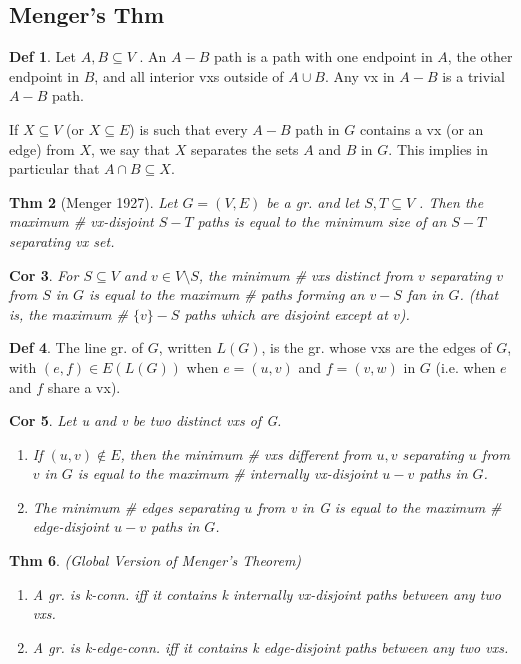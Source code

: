 \documentclass[11pt, fleqn, a4paper, landscape]{article}
\theoremstyle{plain} %
\newtheorem{thm}{Thm}
\newtheorem{cor}[thm]{Cor}
\theoremstyle{remark} %
\theoremstyle{definition} %
\newtheorem{defi}[thm]{Def}
\begin{document}
\begin{multicols}{5}
\subsection{Menger’s Thm}

\begin{defi}
Let $A,B \subseteq V$ . An $A-B$ path is a path with one endpoint in $A$, the other endpoint in $B$, and all interior vxs outside of $A \cup B$. Any vx in $A - B$ is a trivial $A-B$ path.

If $X \subseteq V$ (or $X \subseteq E$) is such that every $A-B$ path in $G$ contains a vx (or an edge) from $X$, we say that $X$ separates the sets $A$ and $B$ in $G$. This implies in particular that $A \cap B \subseteq X$.
\end{defi}
\begin{thm}[Menger 1927]
Let $G = (V,E)$ be a gr. and let $S, T \subseteq V$ . Then the maximum
\# vx-disjoint $S-T$ paths is equal to the minimum size of an $S-T$ separating vx set.
\end{thm}

\begin{cor}
For $S \subseteq V$ and $v\in V \setminus S$, the minimum \# vxs distinct from $v$ separating $v$ from $S$ in $G$ is equal to the maximum \# paths forming an $v-S$ fan in $G$. (that is, the maximum \# $\{v\}-S$ paths which are disjoint except at $v$).
\end{cor}

\begin{defi}
The line gr. of $G$, written $L(G)$, is the gr. whose vxs are the edges of $G$, with $(e, f) \in E(L(G))$ when $e = (u, v)$ and $f = (v,w)$ in $G$ (i.e. when $e$ and $f$ share a vx).
\end{defi}
\addtocounter{thm}{1}
\begin{cor}
Let u and v be two distinct vxs of G.
\begin{enumerate}
\item If $(u, v) \notin E$, then the minimum \# vxs different from $u, v$ separating $u$ from $v$ in $G$ is equal to the maximum \# internally vx-disjoint $u-v$ paths in $G$.
\item The minimum \# edges separating $u$ from v in G is equal to the maximum \# edge-disjoint $u-v$ paths in $G$.
\end{enumerate}
\end{cor}

\begin{thm}
(Global Version of Menger’s Theorem)
\begin{enumerate}
\item A gr. is k-conn. iff it contains k internally vx-disjoint paths between any
two vxs.
\item A gr. is k-edge-conn. iff it contains k edge-disjoint paths between any two
vxs.
\end{enumerate}
\end{thm}


\end{multicols}
\end{document}
